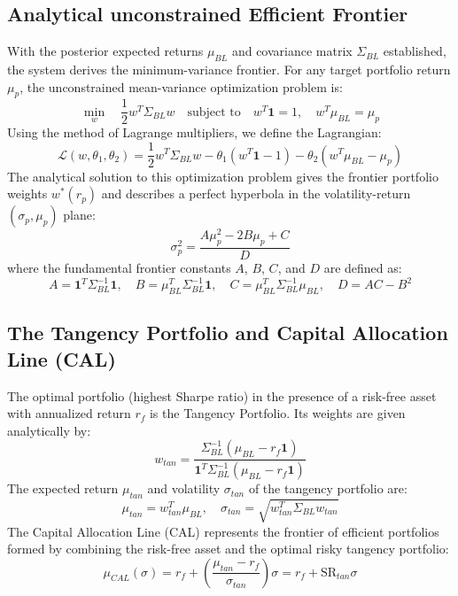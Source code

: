 \documentclass[11pt,a4paper]{article}
\begin{document}
\subsection{Analytical unconstrained Efficient Frontier}
With the posterior expected returns $\mu_{BL}$ and covariance matrix $\Sigma_{BL}$ established, the system derives the minimum-variance frontier. For any target portfolio return $\mu_p$, the unconstrained mean-variance optimization problem is:
\begin{equation}
\min_{w} \quad \frac{1}{2} w^T \Sigma_{BL} w \quad \text{subject to} \quad w^T \mathbf{1} = 1, \quad w^T \mu_{BL} = \mu_p
\end{equation}
Using the method of Lagrange multipliers, we define the Lagrangian:
\begin{equation}
\mathcal{L}(w, \theta_1, \theta_2) = \frac{1}{2} w^T \Sigma_{BL} w - \theta_1 \left( w^T \mathbf{1} - 1 \right) - \theta_2 \left( w^T \mu_{BL} - \mu_p \right)
\end{equation}
The analytical solution to this optimization problem gives the frontier portfolio weights $w^*(r_p)$ and describes a perfect hyperbola in the volatility-return $(\sigma_p, \mu_p)$ plane:
\begin{equation}
\sigma_p^2 = \frac{A \mu_p^2 - 2 B \mu_p + C}{D}
\end{equation}
where the fundamental frontier constants $A$, $B$, $C$, and $D$ are defined as:
\begin{equation}
A = \mathbf{1}^T \Sigma_{BL}^{-1} \mathbf{1}, \quad B = \mu_{BL}^T \Sigma_{BL}^{-1} \mathbf{1}, \quad C = \mu_{BL}^T \Sigma_{BL}^{-1} \mu_{BL}, \quad D = A C - B^2
\end{equation}

\subsection{The Tangency Portfolio and Capital Allocation Line (CAL)}
The optimal portfolio (highest Sharpe ratio) in the presence of a risk-free asset with annualized return $r_f$ is the Tangency Portfolio. Its weights are given analytically by:
\begin{equation}
w_{tan} = \frac{\Sigma_{BL}^{-1} \left( \mu_{BL} - r_f \mathbf{1} \right)}{\mathbf{1}^T \Sigma_{BL}^{-1} \left( \mu_{BL} - r_f \mathbf{1} \right)}
\end{equation}
The expected return $\mu_{tan}$ and volatility $\sigma_{tan}$ of the tangency portfolio are:
\begin{equation}
\mu_{tan} = w_{tan}^T \mu_{BL}, \quad \sigma_{tan} = \sqrt{w_{tan}^T \Sigma_{BL} w_{tan}}
\end{equation}
The Capital Allocation Line (CAL) represents the frontier of efficient portfolios formed by combining the risk-free asset and the optimal risky tangency portfolio:
\begin{equation}
\mu_{CAL}(\sigma) = r_f + \left( \frac{\mu_{tan} - r_f}{\sigma_{tan}} \right) \sigma = r_f + \text{SR}_{tan} \sigma
\end{equation}
\end{document}
